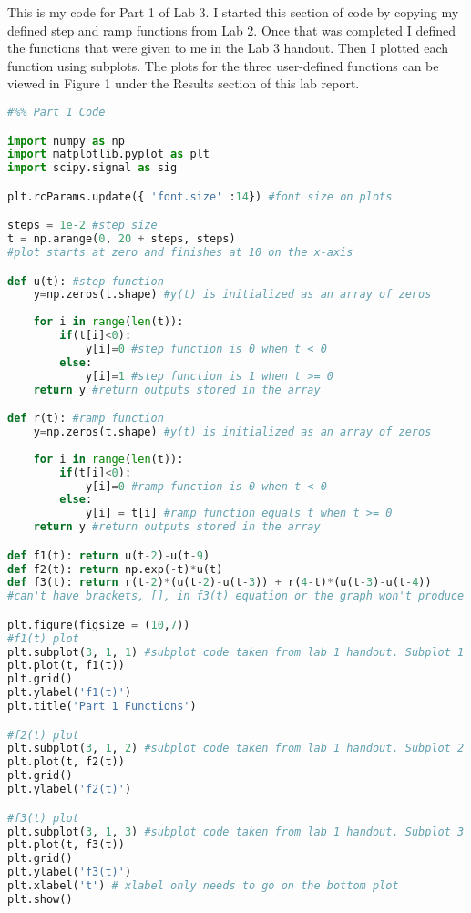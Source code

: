 \documentclass[12pt]{report}
\begin{document}
This is my code for Part 1 of Lab 3. I started this section of code by copying my defined step and ramp functions from Lab 2. Once that was completed I defined the functions that were given to me in the Lab 3 handout. Then I plotted each function using subplots. The plots for the three user-defined functions can be viewed in Figure 1 under the Results section of this lab report.  
\begin{lstlisting}[language=Python]
#%% Part 1 Code

import numpy as np
import matplotlib.pyplot as plt
import scipy.signal as sig

plt.rcParams.update({ 'font.size' :14}) #font size on plots

steps = 1e-2 #step size
t = np.arange(0, 20 + steps, steps) 
#plot starts at zero and finishes at 10 on the x-axis

def u(t): #step function
    y=np.zeros(t.shape) #y(t) is initialized as an array of zeros
    
    for i in range(len(t)):
        if(t[i]<0):
            y[i]=0 #step function is 0 when t < 0
        else:
            y[i]=1 #step function is 1 when t >= 0
    return y #return outputs stored in the array

def r(t): #ramp function
    y=np.zeros(t.shape) #y(t) is initialized as an array of zeros
    
    for i in range(len(t)):
        if(t[i]<0):
            y[i]=0 #ramp function is 0 when t < 0
        else:
            y[i] = t[i] #ramp function equals t when t >= 0
    return y #return outputs stored in the array

def f1(t): return u(t-2)-u(t-9)
def f2(t): return np.exp(-t)*u(t)
def f3(t): return r(t-2)*(u(t-2)-u(t-3)) + r(4-t)*(u(t-3)-u(t-4))
#can't have brackets, [], in f3(t) equation or the graph won't produce

plt.figure(figsize = (10,7))
#f1(t) plot
plt.subplot(3, 1, 1) #subplot code taken from lab 1 handout. Subplot 1
plt.plot(t, f1(t))
plt.grid()
plt.ylabel('f1(t)')
plt.title('Part 1 Functions')

#f2(t) plot
plt.subplot(3, 1, 2) #subplot code taken from lab 1 handout. Subplot 2
plt.plot(t, f2(t))
plt.grid()
plt.ylabel('f2(t)')

#f3(t) plot
plt.subplot(3, 1, 3) #subplot code taken from lab 1 handout. Subplot 3
plt.plot(t, f3(t))
plt.grid()
plt.ylabel('f3(t)')
plt.xlabel('t') # xlabel only needs to go on the bottom plot
plt.show()
\end{lstlisting}
\end{document}
